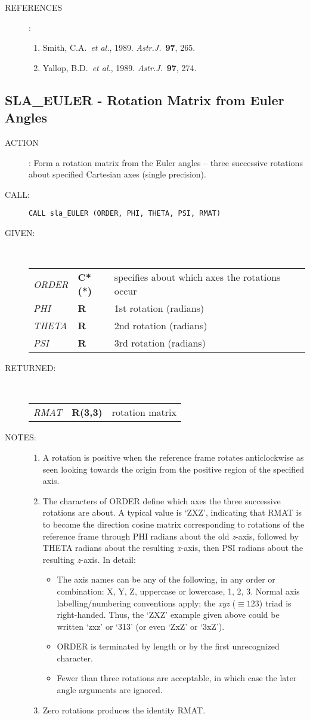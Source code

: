 \documentclass[11pt,twoside]{article}
\newcommand{\xlabel}[1]{}
\newcommand{\routine}[3]
{\hbadness=10000
  \vbox
  {
    \rule{\textwidth}{0.3mm}\\
    {\Large {\bf #1} \hfill #2 \hfill {\bf #1}}\\
    \setlength{\oldspacing}{\topsep}
    \setlength{\topsep}{0.3ex}
    \begin{description}
      #3
    \end{description}
    \setlength{\topsep}{\oldspacing}
  }
}
\renewcommand{\routine}[3]
   {
      \subsection{#1\xlabel{#1} - #2\label{#1}}
       \begin{description}
         #3
       \end{description}
   }
\newcommand{\action}[1]
{\item[ACTION]: #1}
\newcommand{\action}[1]
   {\item[ACTION:] #1}
\newcommand{\call}[1]
{\item[CALL]: \hspace{0.4em}{\tt #1}}
\newlength{\oldspacing}
\renewcommand{\call}[1]
   {
    \item[CALL:] {\tt #1}
   }
\newcommand{\args}[2]
{
  \goodbreak
  \setlength{\oldspacing}{\topsep}
  \setlength{\topsep}{0.3ex}
  \begin{description}
  \item[#1]:\\[1.5ex]
    \begin{tabular}{p{7em}p{6em}p{22em}}
      #2
    \end{tabular}
  \end{description}
  \setlength{\topsep}{\oldspacing}
}
\renewcommand{\args}[2]
   {
     \begin{description}
        \item[#1:]\\
        \begin{tabular}{p{7em}p{6em}l}
           #2
        \end{tabular}
     \end{description}
   }
\newcommand{\spec}[3]
{
  {\em {#1}} & {\bf \mbox{#2}} & {#3}
}
\newcommand{\notes}[1]
{
  \goodbreak
  \setlength{\oldspacing}{\topsep}
  \setlength{\topsep}{0.3ex}
  \begin{description}
    \item[NOTES]:
        #1
  \end{description}
  \setlength{\topsep}{\oldspacing}
}
\renewcommand{\notes}[1]
   {
      \begin{description}
         \item[NOTES:]
            #1
      \end{description}
   }
\newcommand{\refs}[1]
{
  \goodbreak
  \setlength{\oldspacing}{\topsep}
  \setlength{\topsep}{0.3ex}
  \begin{description}
    \item[REFERENCES]:
        #1
  \end{description}
  \setlength{\topsep}{\oldspacing}
}
\newcommand{\refs}[1]
   {
     \begin{description}
       \item[REFERENCES:]
           #1
     \end{description}
   }
\begin{document}
\refs
{
 \begin{enumerate}
  \item Smith, C.A.\ {\it et al.}, 1989.  {\it Astr.J.}\ {\bf 97}, 265.
  \item Yallop, B.D.\ {\it et al.}, 1989.  {\it Astr.J.}\ {\bf 97}, 274.
 \end{enumerate}
}
\routine{SLA\_EULER}{Rotation Matrix from Euler Angles}
{
 \action{Form a rotation matrix from the Euler angles -- three
         successive rotations about specified Cartesian axes
         (single precision).}
 \call{CALL sla\_EULER (ORDER, PHI, THETA, PSI, RMAT)}
}
\args{GIVEN}
{
 \spec{ORDER}{C*(*)}{specifies about which axes the rotations occur} \\
 \spec{PHI}{R}{1st rotation (radians)} \\
 \spec{THETA}{R}{2nd rotation (radians)} \\
 \spec{PSI}{R}{3rd rotation (radians)}
}
\args{RETURNED}
{
 \spec{RMAT}{R(3,3)}{rotation matrix}
}
\notes
{
 \begin{enumerate}
  \item A rotation is positive when the reference frame rotates
        anticlockwise as seen looking towards the origin from the
        positive region of the specified axis.
  \item The characters of ORDER define which axes the three successive
        rotations are about.  A typical value is `ZXZ', indicating that
        RMAT is to become the direction cosine matrix corresponding to
        rotations of the reference frame through PHI radians about the
        old {\it z}-axis, followed by THETA radians about the resulting
        {\it x}-axis,
        then PSI radians about the resulting {\it z}-axis.  In detail:
        \begin{itemize}
         \item The axis names can be any of the following, in any order or
               combination:  X, Y, Z, uppercase or lowercase, 1, 2, 3.  Normal
               axis labelling/numbering conventions apply;
               the {\it xyz} ($\equiv123$)
               triad is right-handed.  Thus, the `ZXZ' example given above
               could be written `zxz' or `313' (or even `ZxZ' or `3xZ').
         \item ORDER is terminated by length or by the first unrecognized
               character.
         \item Fewer than three rotations are acceptable, in which case
               the later angle arguments are ignored.
        \end{itemize}
  \item Zero rotations produces the identity RMAT.
 \end{enumerate}
}
\end{document}
